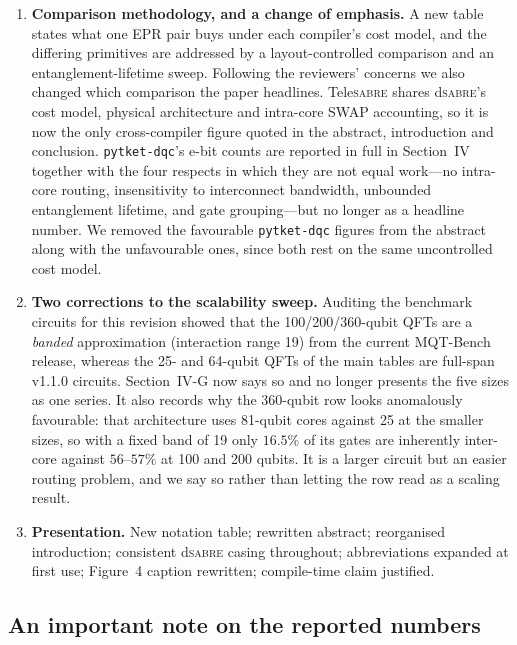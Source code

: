 \documentclass[11pt]{article}
\newcommand{\dSABRE}{d\textsc{sabre}}
\newcommand{\TeleSABRE}{Tele\textsc{sabre}}
\begin{document}
\begin{enumerate}[leftmargin=*]
\item \textbf{Comparison methodology, and a change of emphasis.}  A new
table states what one EPR pair buys under each compiler's cost model,
and the differing primitives are addressed by a layout-controlled
comparison and an entanglement-lifetime sweep.  Following the
reviewers' concerns we also changed which comparison the paper
headlines.  \TeleSABRE{} shares \dSABRE{}'s cost model, physical
architecture and intra-core SWAP accounting, so it is now the only
cross-compiler figure quoted in the abstract, introduction and
conclusion.  \texttt{pytket-dqc}'s e-bit counts are reported in full in
Section~IV together with the four respects in which they are not equal
work---no intra-core routing, insensitivity to interconnect bandwidth,
unbounded entanglement lifetime, and gate grouping---but no longer as a
headline number.  We removed the favourable \texttt{pytket-dqc}
figures from the abstract along with the unfavourable ones, since both
rest on the same uncontrolled cost model.

\item \textbf{Two corrections to the scalability sweep.}  Auditing the
benchmark circuits for this revision showed that the 100/200/360-qubit
QFTs are a \emph{banded} approximation (interaction range 19) from the
current MQT-Bench release, whereas the 25- and 64-qubit QFTs of the main
tables are full-span v1.1.0 circuits.  Section~IV-G now says so and no
longer presents the five sizes as one series.  It also records why the
360-qubit row looks anomalously favourable: that architecture uses
81-qubit cores against 25 at the smaller sizes, so with a fixed band of
19 only $16.5\%$ of its gates are inherently inter-core against $56$--$57\%$
at 100 and 200 qubits.  It is a larger circuit but an easier routing
problem, and we say so rather than letting the row read as a scaling
result.

\item \textbf{Presentation.}  New notation table; rewritten abstract;
reorganised introduction; consistent \dSABRE{} casing throughout;
abbreviations expanded at first use; Figure~4 caption rewritten;
compile-time claim justified.

\end{enumerate}

\subsection*{An important note on the reported numbers}
\end{document}
